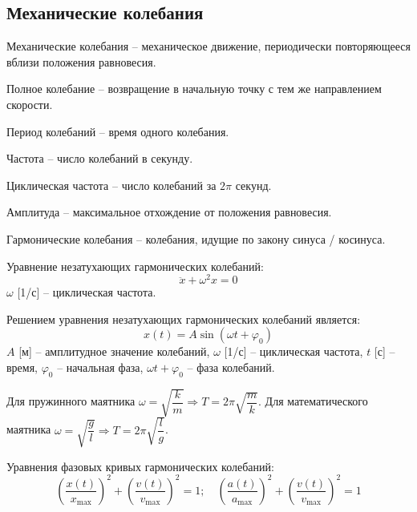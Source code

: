 \documentclass[12pt]{article}
\begin{document}
\subsection{Механические колебания}

\begin{definition}
    Механические колебания -- механическое движение, периодически повторяющееся вблизи положения равновесия.
\end{definition}
\begin{definition}
    Полное колебание -- возвращение в начальную точку с тем же направлением скорости.
\end{definition}
\begin{definition}
    Период колебаний -- время одного колебания.
\end{definition}
\begin{definition}
    Частота -- число колебаний в секунду.
\end{definition}
\begin{definition}
    Циклическая частота -- число колебаний за $2\pi$ секунд.
\end{definition}
\begin{definition}
    Амплитуда -- максимальное отхождение от положения равновесия.
\end{definition}
\begin{definition}
    Гармонические колебания -- колебания, идущие по закону синуса / косинуса.
\end{definition}
\begin{theorem}
    Уравнение незатухающих гармонических колебаний:
    $$\ddot{x}+\omega^2 x=0$$
    $\omega$ [1/с] -- циклическая частота.
\end{theorem}
\begin{theorem}
    Решением уравнения незатухающих гармонических колебаний является:
    $$x(t)=A\sin (\omega t + \varphi_0)$$
    $A$ [м] -- амплитудное значение колебаний, $\omega$ [1/с] -- циклическая частота, $t$ [с] -- время, $\varphi_0$ -- начальная фаза, $\omega t+\varphi_0$ -- фаза колебаний.
\end{theorem}
\setcounter{subsection}{12}
\begin{consequence}
    Для пружинного маятника $\omega=\sqrt{\dfrac{k}{m}}\Longrightarrow T=2\pi\sqrt{\dfrac{m}{k}}$. Для математического маятника $\omega=\sqrt{\dfrac{g}{l}}\Longrightarrow T = 2\pi\sqrt{\dfrac{l}{g}}$.
\end{consequence}
\setcounter{subsection}{5}
\begin{theorem}
    Уравнения фазовых кривых гармонических колебаний:
    $$\left(\frac{x(t)}{x_{\max}}\right)^2+\left(\frac{v(t)}{v_{\max}}\right)^2=1;\quad\left(\frac{a(t)}{a_{\max}}\right)^2+\left(\frac{v(t)}{v_{\max}}\right)^2=1$$
\end{theorem}
\end{document}
